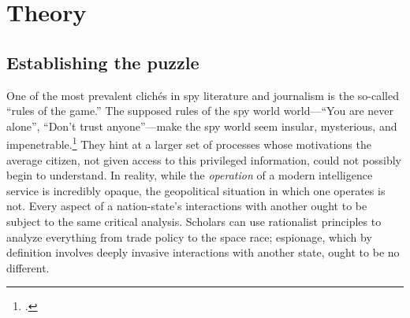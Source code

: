 \documentclass[14pt]{extarticle}
\begin{document}



\section{Theory}
\subsection{Establishing the puzzle}
One of the most prevalent clich\'es in spy literature and journalism is the so-called \enquote{rules of the game.} The supposed rules of the spy world world---\enquote{You are never alone}, \enquote{Don't trust anyone}---make the spy world seem insular, mysterious, and impenetrable.\footcite{myre_moscow_2019} They hint at a larger set of processes whose motivations the average citizen, not given access to this privileged information, could not possibly begin to understand. In reality, while the \emph{operation} of a modern intelligence service is incredibly opaque, the geopolitical situation in which one operates is not. Every aspect of a nation-state's interactions with another ought to be subject to the same critical analysis. Scholars can use rationalist principles to analyze everything from trade policy to the space race; espionage, which by definition involves deeply invasive interactions with another state, ought to be no different.
\end{document}
